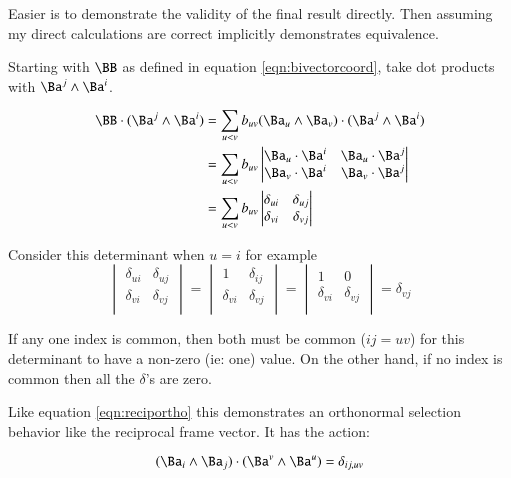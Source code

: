 \documentclass{article}      %
\begin{document}
Easier is to demonstrate the validity of the final result directly.  Then assuming my direct calculations
are correct implicitly demonstrates equivalence.

Starting with $\BB$ as defined in equation \ref{eqn:bivectorcoord}, take dot products with 
$\Ba^j \wedge \Ba^i$.

\begin{align*}
\BB \cdot (\Ba^j \wedge \Ba^i)
 &= \sum_{u<v} b_{uv} (\Ba_u \wedge \Ba_v) \cdot (\Ba^j \wedge \Ba^i) \\
 &= \sum_{u<v} b_{uv} 
\begin{vmatrix}
\Ba_u \cdot \Ba^i & \Ba_u \cdot \Ba^j \\
\Ba_v \cdot \Ba^i & \Ba_v \cdot \Ba^j \\
\end{vmatrix} \\
 &= \sum_{u<v} b_{uv} 
\begin{vmatrix}
\delta_{ui} & \delta_{uj} \\
\delta_{vi} & \delta_{vj} \\
\end{vmatrix} \\
\end{align*}

Consider this determinant when $u=i$ for example
\[
\begin{vmatrix}
\delta_{ui} & \delta_{uj} \\
\delta_{vi} & \delta_{vj} \\
\end{vmatrix} 
=
\begin{vmatrix}
1 & \delta_{ij} \\
\delta_{vi} & \delta_{vj} \\
\end{vmatrix}
=
\begin{vmatrix}
1 & 0 \\
\delta_{vi} & \delta_{vj} \\
\end{vmatrix}
= \delta_{vj}
\]

If any one index is common, then both must be common ($ij=uv$) for this determinant to have a non-zero (ie: one) value.  On the other hand, if no index is common then all the $\delta$'s are zero.

Like 
equation \ref{eqn:reciportho}
this demonstrates an orthonormal selection behavior like the reciprocal frame vector.  It has the action:

\begin{equation}
(\Ba_i \wedge \Ba_j) \cdot (\Ba^v \wedge \Ba^u) = \delta_{ij,uv}
\end{equation}
\end{document}
